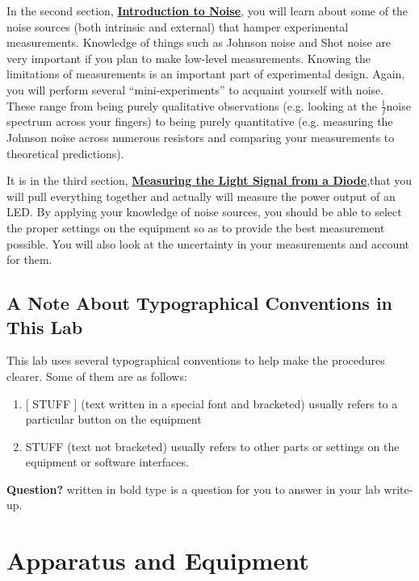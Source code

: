 \documentclass{../lab}
\begin{document}
In the second section, \href{http://experimentationlab.berkeley.edu/IntroductiontoNoise}{\textbf{Introduction to Noise}}, you will learn about some of the noise sources (both intrinsic and external) that hamper experimental measurements. Knowledge of things such as Johnson noise and Shot noise are very important if you plan to make low-level measurements. Knowing the limitations of measurements is an important part of experimental design. Again, you will perform several ``mini-experiments'' to acquaint yourself with noise. These range from being purely qualitative observations (e.g. looking at the $ \frac{1}{f} $noise spectrum across your fingers) to being purely quantitative (e.g. measuring the Johnson noise across numerous resistors and comparing your measurements to theoretical predictions).

It is in the third section, \href{http://experimentationlab.berkeley.edu/LightSignal}{\textbf{Measuring the Light Signal from a Diode}},that you will pull everything together and actually will measure the power output of an LED. By applying your knowledge of noise sources, you should be able to select the proper settings on the equipment so as to provide the best measurement possible. You will also look at the uncertainty in your measurements and account for them.

\subsection{A Note About Typographical Conventions in This Lab}

This lab uses several typographical conventions to help make the procedures clearer. Some of them are as follows:

\begin{enumerate}
    \item {[ STUFF ]} (text written in a special font and bracketed) usually refers to a particular button on the equipment

    \item STUFF (text not bracketed) usually refers to other parts or settings on the equipment or software interfaces.

\end{enumerate}

\textbf{Question?} written in bold type is a question for you to answer in your lab write-up.

\section{Apparatus and Equipment}
\end{document}
